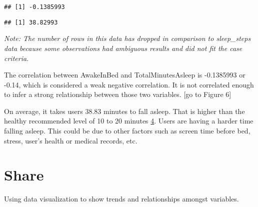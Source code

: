 \documentclass[
]{article}
\newenvironment{Shaded}{\begin{snugshade}}{\end{snugshade}}
\newcommand{\CommentTok}[1]{\textcolor[rgb]{0.56,0.35,0.01}{\textit{#1}}}
\newcommand{\FunctionTok}[1]{\textcolor[rgb]{0.00,0.00,0.00}{#1}}
\newcommand{\NormalTok}[1]{#1}
\newcommand{\SpecialCharTok}[1]{\textcolor[rgb]{0.00,0.00,0.00}{#1}}
\begin{document}
\begin{Shaded}
\end{Shaded}

\begin{verbatim}
## [1] -0.1385993
\end{verbatim}

\begin{Shaded}
\end{Shaded}

\begin{verbatim}
## [1] 38.82993
\end{verbatim}

\emph{{Note: The number of rows in this data has dropped in comparison
to sleep\_steps data because some observations had ambiguous results and
did not fit the case criteria. }}

The correlation between AwakeInBed and TotalMinutesAsleep is -0.1385993
or -0.14, which is considered a weak negative correlation. It is not
correlated enough to infer a strong relationship between those two
variables. {[}go to Figure 6{]}

On average, it takes users 38.83 minutes to fall asleep. That is higher
than the healthy recommended level of 10 to 20 minutes
\href{https://www.healthline.com/health/healthy-sleep/how-long-does-it-take-to-fall-asleep\#:~:text=It\%20should\%20take\%20between\%2010,fall\%20asleep\%20much\%20more\%20quickly}{4}.
Users are having a harder time falling asleep. This could be due to
other factors such as screen time before bed, stress, user's health or
medical records, etc.

\hypertarget{share}{%
\section{Share}\label{share}}

Using data visualization to show trends and relationships amongst
variables.
\end{document}
